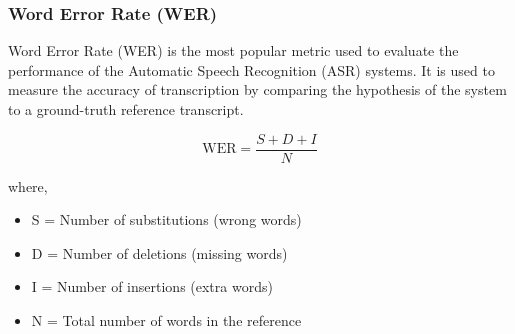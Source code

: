 \subsubsection{Word Error Rate (WER)}
Word Error Rate (WER) is the most popular metric used to evaluate the performance of the Automatic Speech Recognition (ASR) systems. It is used to measure the accuracy of transcription by comparing the hypothesis of the system to a ground-truth reference transcript.


\begin{equation}
	\text{WER} = \frac{S+D+I}{N}
\end{equation}

where,
\begin{itemize}
	\item S = Number of substitutions (wrong words)
	\item D = Number of deletions (missing words)
	\item I = Number of insertions (extra words)
	\item N = Total number of words in the reference
\end{itemize}
